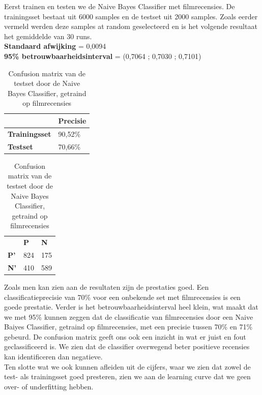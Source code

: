 Eerst trainen en testen we de Naive Bayes Classifier met filmrecensies. De trainingsset bestaat uit 6000 samples en de testset uit 2000 samples. Zoals eerder vermeld werden deze samples at random geselecteerd en is het volgende resultaat het gemiddelde van 30 runs.\\

\newpage\textbf{Standaard afwijking} = 0,0094\\
\textbf{95\% betrouwbaarheidsinterval} = (0,7064 ; 0,7030 ; 0,7101)\\

\begin{table}[h]
\centering
\setlength\tabcolsep{4pt}
\begin{minipage}[t]{0.48\textwidth}
\centering
\begin{tabular}{l|l|}
\cline{2-2}
                                            & \textbf{Precisie} \\ \hline
\multicolumn{1}{|l|}{\textbf{Trainingsset}} & 90,52\%           \\ \hline
\multicolumn{1}{|l|}{\textbf{Testset}}      & 70,66\%           \\ \hline
\end{tabular}
\caption{Classificatieprecisie Naive Bayes Classifier, getraind op filmrecensies}
\label{tab:movie-movie}
\end{minipage}%
\hfill
\begin{minipage}[t]{0.48\textwidth}
\centering
\begin{tabular}{lll}
                                 & \textbf{P}               & \textbf{N}               \\ \cline{2-3} 
\multicolumn{1}{l|}{\textbf{P'}} & \multicolumn{1}{l|}{824} & \multicolumn{1}{l|}{175} \\ \cline{2-3} 
\multicolumn{1}{l|}{\textbf{N'}} & \multicolumn{1}{l|}{410} & \multicolumn{1}{l|}{589} \\ \cline{2-3} 
\end{tabular}
\caption{Confusion matrix van de testset door de  Naive Bayes Classifier, getraind op filmrecensies} 
\label{tab:cm-movie-movie} 
\end{minipage}
\end{table}

Zoals men kan zien aan de resultaten zijn de prestaties goed. Een classificatieprecisie van 70\% voor een onbekende set met filmrecensies is een goede prestatie. Verder is het betrouwbaarheidsinterval heel klein, wat maakt dat we met 95\% kunnen zeggen dat de classificatie van filmrecensies door een Naive Baiyes Classifier, getraind op filmrecensies, met een precisie tussen 70\% en 71\% gebeurd. De confusion matrix geeft ons  ook een inzicht in wat er juist en fout geclassificeerd is. We zien dat de classifier overwegend beter positieve recensies kan identificeren dan negatieve.\\
%
Ten slotte wat we ook kunnen afleiden uit de cijfers, waar we zien dat zowel de test- als trainingsset goed presteren, zien we aan de learning curve dat we geen over- of underfitting hebben. 

